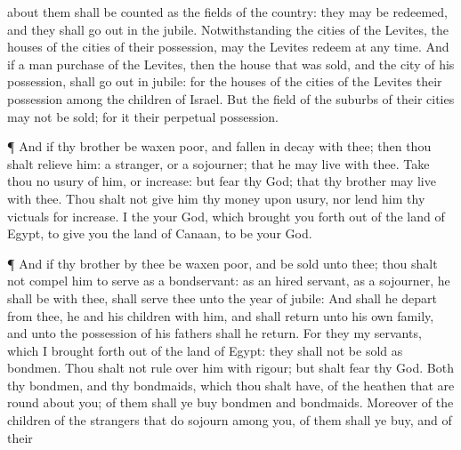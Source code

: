 {about them shall be
counted as the
fields of the
country: they may be
redeemed, and they shall go
out in the
jubile.
Notwithstanding the
cities of the
Levites,
{} the
houses of the
cities of their
possession, may the
Levites
redeem at any
time.
And if a man
purchase of the
Levites, then the
house that was
sold, and the
city of his
possession, shall go
out in
{}
jubile: for the
houses of the
cities of the
Levites
{} their
possession
among the
children of
Israel.
But the
field of the
suburbs of their
cities may not be
sold; for it
{} their
perpetual
possession.
\par }{\PP {}¶ And if thy
brother be waxen
poor, and fallen in
decay with
thee; then thou shalt
relieve him:
{} a
stranger, or a
sojourner; that he may
live with thee.
Take thou no
usury of him, or
increase: but
fear thy
God; that thy
brother may
live with thee.
Thou shalt not
give him thy
money upon
usury, nor
lend him thy
victuals for
increase.
I
{} the
{} your
God, which brought you
forth out of the
land of
Egypt, to
give you the
land of
Canaan,
{} to be your
God.
\par }{\PP {}¶ And if thy
brother
{} by thee be waxen
poor, and be
sold unto thee; thou shalt not
compel him to
serve as a
bondservant:
 as an hired
servant,
{} as a
sojourner, he shall be with thee,
{} shall
serve thee unto the
year of
jubile:
And
{} shall he
depart from thee,
{} he and his
children with him, and shall
return unto his own
family, and unto the
possession of his
fathers shall he
return.
For they
{} my
servants, which I brought
forth out of the
land of
Egypt: they shall not be
sold
as
bondmen.
Thou shalt not
rule over him with
rigour; but shalt
fear thy
God.
Both thy
bondmen, and thy
bondmaids, which thou shalt have,
{} of the
heathen that are round
about you; of them shall ye
buy
bondmen and
bondmaids.
Moreover of the
children of the
strangers that do
sojourn among you, of them shall ye
buy, and of their
}
